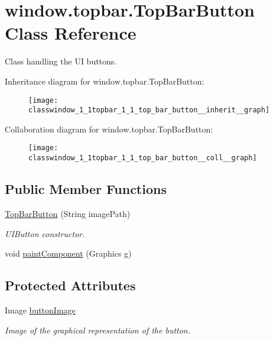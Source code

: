 \hypertarget{classwindow_1_1topbar_1_1_top_bar_button}{\section{window.\-topbar.\-Top\-Bar\-Button Class Reference}
\label{classwindow_1_1topbar_1_1_top_bar_button}
}


Class handling the U\-I buttons.  




Inheritance diagram for window.\-topbar.\-Top\-Bar\-Button\-:
\nopagebreak
\begin{figure}[H]
\begin{center}
\leavevmode
\texttt{[image: classwindow\_1\_1topbar\_1\_1\_top\_bar\_button\_\_inherit\_\_graph]}
\end{center}
\end{figure}


Collaboration diagram for window.\-topbar.\-Top\-Bar\-Button\-:
\nopagebreak
\begin{figure}[H]
\begin{center}
\leavevmode
\texttt{[image: classwindow\_1\_1topbar\_1\_1\_top\_bar\_button\_\_coll\_\_graph]}
\end{center}
\end{figure}
\subsection*{Public Member Functions}
\begin{DoxyCompactItemize}
\item 
\hyperlink{classwindow_1_1topbar_1_1_top_bar_button_ad3d5951123e05fbf97030d53abc70814}{Top\-Bar\-Button} (String image\-Path)
\begin{DoxyCompactList}\small\item\em U\-I\-Button constructor. \end{DoxyCompactList}\item 
void \hyperlink{classwindow_1_1topbar_1_1_top_bar_button_a5268cb4eb3f6f1f7dc3925827c1664d8}{paint\-Component} (Graphics g)
\end{DoxyCompactItemize}
\subsection*{Protected Attributes}
\begin{DoxyCompactItemize}
\item 
Image \hyperlink{classwindow_1_1topbar_1_1_top_bar_button_a2a050ade4f03c9c48f1d338e88b9e21c}{button\-Image}
\begin{DoxyCompactList}\small\item\em Image of the graphical representation of the button. \end{DoxyCompactList}\end{DoxyCompactItemize}


